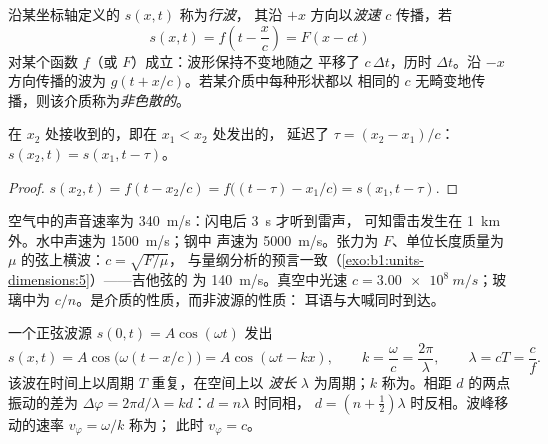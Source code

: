 \begin{definition}[行波；波速]\label{def:b1:wave-propagation:travelling}
沿某坐标轴定义的 $s(x, t)$ 称为\emph{行波}，
其沿 $+x$ 方向以\emph{波速} $c$ 传播，若
\[
s(x, t) = f\!\left(t - \frac{x}{c}\right) = F(x - ct)
\]
对某个函数 $f$（或 $F$）成立：波形保持不变地随之
平移了 $c\,\Delta t$，历时 $\Delta t$。沿 $-x$ 方向传播的波为
$g(t + x/c)$。若某介质中每种形状都以
相同的 $c$ 无畸变地传播，则该介质称为\emph{非色散的}。
\end{definition}

\begin{proposition}[延迟]\label{prop:b1:wave-propagation:delay}
在 $x_2$ 处接收到的，即在 $x_1 < x_2$ 处发出的，
延迟了 $\tau = (x_2 - x_1)/c$：$s(x_2, t) = s(x_1, t - \tau)$。
\end{proposition}

\begin{proof}
$s(x_2, t) = f(t - x_2/c) = f\big((t - \tau) - x_1/c\big) = s(x_1, t - \tau)$.
\end{proof}

\begin{example}[波速]\label{ex:b1:wave-propagation:celerities}
空气中的声音速率为 \qty{340}{m/s}：闪电后 \qty{3}{s} 才听到雷声，
可知雷击发生在 \qty{1}{km} 外。水中声速为 \qty{1500}{m/s}；钢中
声速为 \qty{5000}{m/s}。张力为 $F$、单位长度质量为
$\mu$ 的弦上横波：$c = \sqrt{F/\mu}$，
与量纲分析的预言一致（\cref{exo:b1:units-dimensions:5}）——吉他弦的
为 \qty{140}{m/s}。真空中光速 $c = \qty{3.00e8}{m/s}$；玻璃中为
$c/n$。是介质的性质，而非波源的性质：
耳语与大喊同时到达。
\end{example}

\begin{proposition}[正弦行波]\label{prop:b1:wave-propagation:sinusoidal}
一个正弦波源 $s(0, t) = A\cos(\omega t)$ 发出
\[
s(x, t) = A\cos\!\big(\omega(t - x/c)\big) = A\cos(\omega t - kx),
\qquad k = \frac{\omega}{c} = \frac{2\pi}{\lambda},
\qquad \lambda = cT = \frac{c}{f}.
\]
该波在时间上以周期 $T$ 重复，在空间上以
\emph{波长} $\lambda$ 为周期；$k$ 称为\emph{}。相距
$d$ 的两点振动的差为
$\Delta\varphi = 2\pi d/\lambda = kd$：$d = n\lambda$ 时同相，
$d = (n + \tfrac12)\lambda$ 时反相。波峰移动的速率
$v_\varphi = \omega/k$ 称为\emph{}；
此时 $v_\varphi = c$。
\end{proposition}

